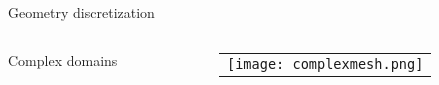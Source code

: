 \begin{frame}{Geometry discretization}
\begin{columns}
\begin{column}{0.5\textwidth}
\begin{block}{Complex domains}
\begin{itemize}
       \end{itemize}
     \end{block}

     \end{column}
     \begin{column}{0.4\textwidth}

       \vspace{1cm}
       \begin{tabular}{c}
       \texttt{[image: complexmesh.png]} \\
     \end{tabular}

     \end{column}
   \end{columns}



 \end{frame}



